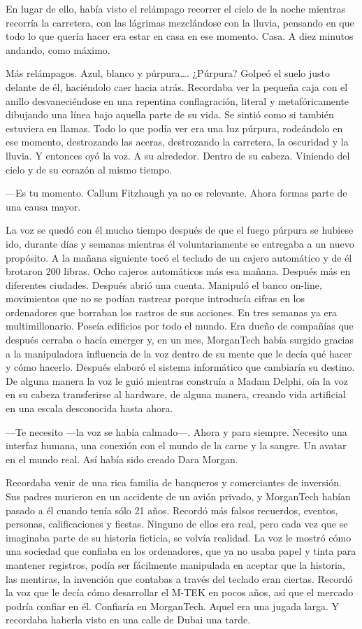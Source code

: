 En lugar de ello, había visto el relámpago recorrer el cielo de la noche
mientras recorría la carretera, con las lágrimas mezclándose con la
lluvia, pensando en que todo lo que quería hacer era estar en casa en
ese momento. Casa. A diez minutos andando, como máximo.

Más relámpagos. Azul, blanco y púrpura\ldots{}. ¿Púrpura? Golpeó el
suelo justo delante de él, haciéndolo caer hacia atrás. Recordaba ver la
pequeña caja con el anillo desvaneciéndose en una repentina
conflagración, literal y metafóricamente dibujando una línea bajo
aquella parte de su vida. Se sintió como si también estuviera en llamas.
Todo lo que podía ver era una luz púrpura, rodeándolo en ese momento,
destrozando las aceras, destrozando la carretera, la oscuridad y la
lluvia. Y entonces oyó la voz. A su alrededor. Dentro de su cabeza.
Viniendo del cielo y de su corazón al mismo tiempo.

---Es tu momento. Callum Fitzhaugh ya no es relevante. Ahora formas
parte de una causa mayor.

La voz se quedó con él mucho tiempo después de que el fuego púrpura se
hubiese ido, durante días y semanas mientras él voluntariamente se
entregaba a un nuevo propósito. A la mañana siguiente tocó el teclado de
un cajero automático y de él brotaron 200 libras. Ocho cajeros
automáticos más esa mañana. Después más en diferentes ciudades. Después
abrió una cuenta. Manipuló el banco on-line, movimientos que no se
podían rastrear porque introducía cifras en los ordenadores que borraban
los rastros de sus acciones. En tres semanas ya era multimillonario.
Poseía edificios por todo el mundo. Era dueño de compañías que después
cerraba o hacía emerger y, en un mes, MorganTech había surgido gracias a
la manipuladora influencia de la voz dentro de su mente que le decía qué
hacer y cómo hacerlo. Después elaboró el sistema informático que
cambiaría su destino. De alguna manera la voz le guió mientras construía
a Madam Delphi, oía la voz en su cabeza transferirse al hardware, de
alguna manera, creando vida artificial en una escala desconocida hasta
ahora.

---Te necesito ---la voz se había calmado---. Ahora y para siempre.
Necesito una interfaz humana, una conexión con el mundo de la carne y la
sangre. Un avatar en el mundo real. Así había sido creado Dara Morgan.

Recordaba venir de una rica familia de banqueros y comerciantes de
inversión. Sus padres murieron en un accidente de un avión privado, y
MorganTech habían pasado a él cuando tenía sólo 21 años. Recordó más
falsos recuerdos, eventos, personas, calificaciones y fiestas. Ninguno
de ellos era real, pero cada vez que se imaginaba parte de su historia
ficticia, se volvía realidad. La voz le mostró cómo una sociedad que
confiaba en los ordenadores, que ya no usaba papel y tinta para mantener
registros, podía ser fácilmente manipulada en aceptar que la historia,
las mentiras, la invención que contabas a través del teclado eran
ciertas. Recordó la voz que le decía cómo desarrollar el M-TEK en pocos
años, así que el mercado podría confiar en él. Confiaría en MorganTech.
Aquel era una jugada larga. Y recordaba haberla visto en una calle de
Dubai una tarde.

